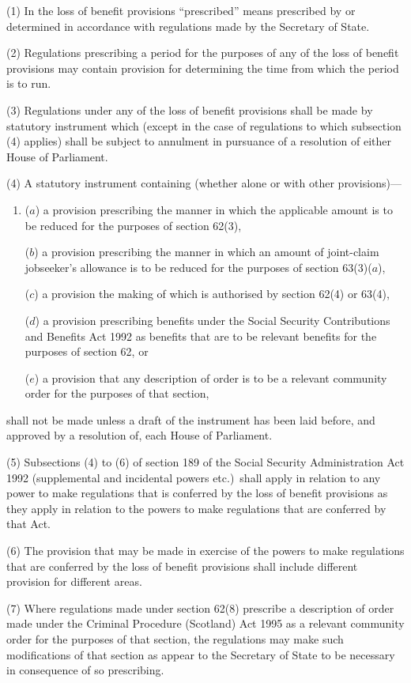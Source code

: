 \documentclass[12pt,a4paper]{article}
\begin{document}
(1) In the loss of benefit provisions “prescribed” means prescribed by or determined in accordance with regulations made by the Secretary of State.

(2) Regulations prescribing a period for the purposes of any of the loss of benefit provisions may contain provision for determining the time from which the period is to run.

(3) Regulations under any of the loss of benefit provisions shall be made by statutory instrument which (except in the case of regulations to which subsection (4)  applies) shall be subject to annulment in pursuance of a resolution of either House of Parliament.

(4) A statutory instrument containing (whether alone or with other provisions)—
\begin{enumerate}\item[]
($a$) a provision prescribing the manner in which the applicable amount is to be reduced for the purposes of section 62(3),

($b$) a provision prescribing the manner in which an amount of joint-claim jobseeker’s allowance is to be reduced for the purposes of section 63(3)($a$),

($c$) a provision the making of which is authorised by section 62(4)  or 63(4),

($d$) a provision prescribing benefits under the Social Security Contributions and Benefits Act 1992 as benefits that are to be relevant benefits for the purposes of section 62, or

($e$) a provision that any description of order is to be a relevant community order for the purposes of that section,
\end{enumerate}
shall not be made unless a draft of the instrument has been laid before, and approved by a resolution of, each House of Parliament.

(5) Subsections (4)  to (6)  of section 189 of the Social Security Administration Act 1992 (supplemental and incidental powers etc.)\ shall apply in relation to any power to make regulations that is conferred by the loss of benefit provisions as they apply in relation to the powers to make regulations that are conferred by that Act.

(6) The provision that may be made in exercise of the powers to make regulations that are conferred by the loss of benefit provisions shall include different provision for different areas.

(7) Where regulations made under section 62(8)  prescribe a description of order made under the Criminal Procedure (Scotland) Act 1995 as a relevant community order for the purposes of that section, the regulations may make such modifications of that section as appear to the Secretary of State to be necessary in consequence of so prescribing.
\end{document}
